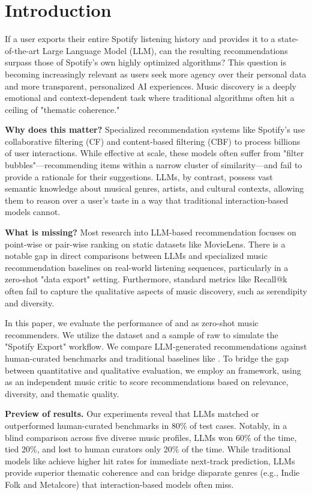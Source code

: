 \section{Introduction}

If a user exports their entire Spotify listening history and provides it to a state-of-the-art Large Language Model (LLM), can the resulting recommendations surpass those of Spotify's own highly optimized algorithms? This question is becoming increasingly relevant as users seek more agency over their personal data and more transparent, personalized AI experiences. Music discovery is a deeply emotional and context-dependent task where traditional algorithms often hit a ceiling of "thematic coherence."

{\bf Why does this matter?} Specialized recommendation systems like Spotify's use collaborative filtering (CF) and content-based filtering (CBF) to process billions of user interactions. While effective at scale, these models often suffer from "filter bubbles"---recommending items within a narrow cluster of similarity---and fail to provide a rationale for their suggestions. LLMs, by contrast, possess vast semantic knowledge about musical genres, artists, and cultural contexts, allowing them to reason over a user's taste in a way that traditional interaction-based models cannot.

{\bf What is missing?} Most research into LLM-based recommendation focuses on point-wise or pair-wise ranking on static datasets like MovieLens. There is a notable gap in direct comparisons between LLMs and specialized music recommendation baselines on real-world listening sequences, particularly in a zero-shot "data export" setting. Furthermore, standard metrics like Recall@k often fail to capture the qualitative aspects of music discovery, such as serendipity and diversity.

In this paper, we evaluate the performance of \claudesonnet and \gptfour as zero-shot music recommenders. We utilize the \musicrs dataset \cite{surana2025musicrs} and a sample of raw \spotifydata to simulate the "Spotify Export" workflow. We compare LLM-generated recommendations against human-curated benchmarks and traditional baselines like \bpr \cite{rendle2012bpr}. To bridge the gap between quantitative and qualitative evaluation, we employ an \judge framework, using \gptfour as an independent music critic to score recommendations based on relevance, diversity, and thematic quality.

{\bf Preview of results.} Our experiments reveal that LLMs matched or outperformed human-curated benchmarks in 80\% of test cases. Notably, in a blind comparison across five diverse music profiles, LLMs won 60\% of the time, tied 20\%, and lost to human curators only 20\% of the time. While traditional models like \bpr achieve higher hit rates for immediate next-track prediction, LLMs provide superior thematic coherence and can bridge disparate genres (e.g., Indie Folk and Metalcore) that interaction-based models often miss.

